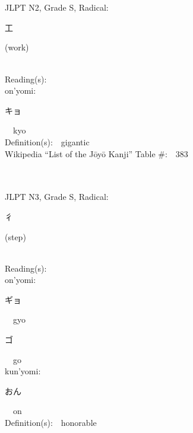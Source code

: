 \begin{multicols}{2}
\ \ \\
{\fontsize{34pt}{40pt}  }\ \ \\  %
{JLPT N2, Grade S, Radical:\ \ {\begin{CJK}{UTF8}{min} 工 \end{CJK}} (work) } \\
Reading(s):\ \ \\
{\hspace*{1em}}on'yomi:\ \ \\
{\hspace*{2em}}{\begin{CJK}{UTF8}{min} キョ \end{CJK}}\ \ kyo\ \ \\
Definition(s):\ \ gigantic \\
Wikipedia ``List of the J\=oy\=o Kanji'' Table \#:\ \ 383 \\
\ \ \\
{\fontsize{34pt}{40pt}  }\ \ \\  %
{JLPT N3, Grade S, Radical:\ \ {\begin{CJK}{UTF8}{min} 彳 \end{CJK}} (step) } \\
Reading(s):\ \ \\
{\hspace*{1em}}on'yomi:\ \ \\
{\hspace*{2em}}{\begin{CJK}{UTF8}{min} ギョ \end{CJK}}\ \ gyo\ \ \\
{\hspace*{2em}}{\begin{CJK}{UTF8}{min} ゴ \end{CJK}}\ \ go\ \ \\
{\hspace*{1em}}kun'yomi:\ \ \\
{\hspace*{2em}}{\begin{CJK}{UTF8}{min} おん \end{CJK}}\ \ on\ \ \\
Definition(s):\ \ honorable \\

\end{multicols}

